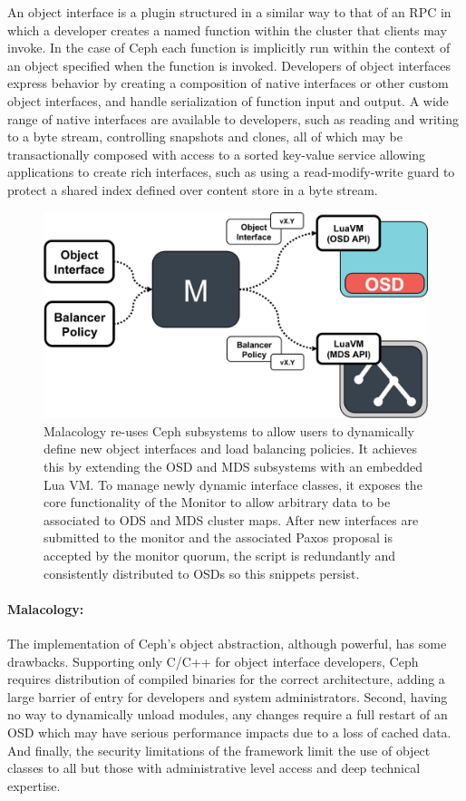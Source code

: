 \documentclass[10pt,twocolumn]{article}
\begin{document}
An object interface is a plugin structured in a similar way to that of an RPC
in which a developer creates a named function within the cluster that clients
may invoke. In the case of Ceph each function is implicitly run within the
context of an object specified when the function is invoked. Developers of
object interfaces express behavior by creating a composition of native
interfaces or other custom object interfaces, and handle serialization of
function input and output. A wide range of native interfaces are available to
developers, such as reading and writing to a byte stream, controlling snapshots
and clones, all of which may be transactionally composed with access to a
sorted key-value service allowing applications to create rich interfaces, such
as using a read-modify-write guard to protect a shared index defined over
content store in a byte stream.

\begin{figure}[htbp]
\centering
\includegraphics{figures/implementation.png}
\caption{Malacology re-uses Ceph subsystems to allow users to dynamically define 
new object interfaces and load balancing policies. It achieves this by extending 
the OSD and MDS subsystems with an embedded Lua VM. To manage newly dynamic 
interface classes, it exposes the core functionality of the Monitor to allow 
arbitrary data to be associated to ODS and MDS cluster maps. After new 
interfaces are submitted to the monitor and the associated Paxos proposal is 
accepted by the monitor quorum, the script is redundantly and consistently 
distributed to OSDs so this snippets persist.
\label{fig:implementation}}
\end{figure}

\paragraph*{Malacology:} The implementation of Ceph's object abstraction,
although powerful, has some drawbacks. Supporting only C/C++ for object
interface developers, Ceph requires distribution of compiled binaries for the
correct architecture, adding a large barrier of entry for developers and
system administrators. Second, having no way to dynamically unload modules,
any changes require a full restart of an OSD which may have serious
performance impacts due to a loss of cached data. And
finally, the security limitations of the framework limit the use of object
classes to all but those with administrative level access and deep technical
expertise.
\end{document}
